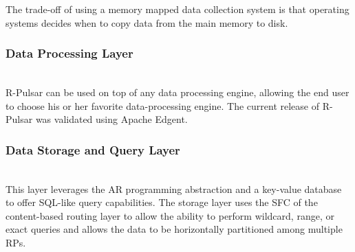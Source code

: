 The trade-off of using a memory mapped data collection system is that operating systems decides when to copy data from the main memory to disk. %

\begin{table}[h!]
\centering

\caption{Measurements of Disk I/O vs RAM memory performance on a Raspberry Pi.} \label{tb:table1}
\vspace{-2ex}
\end{table}

\vspace{1.5ex}
\subsubsection{Data Processing Layer}
\hfill\\
R-Pulsar can be used on top of any data processing engine, allowing the end user to choose his or her favorite data-processing engine. The current release of R-Pulsar was validated using Apache Edgent. 

\vspace{1.5ex}
\subsubsection{Data Storage and Query Layer}
\hfill\\
This layer leverages the AR programming abstraction and a key-value database to offer SQL-like query capabilities. The storage layer uses the SFC of the content-based routing layer to allow the ability to perform wildcard, range, or exact queries and allows the data to be horizontally partitioned among multiple RPs. 

